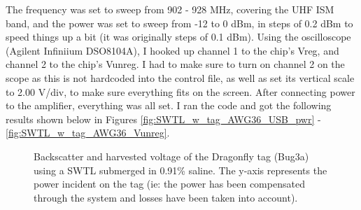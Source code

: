 \documentclass[12pt,onecolumn,titlepage]{article}
\begin{document}
The frequency was set to sweep from 902 - 928 MHz, covering the UHF ISM band, and the power was set to sweep from -12 to 0 dBm, in steps of 0.2 dBm to speed things up a bit (it was originally steps of 0.1 dBm). Using the oscilloscope (Agilent Infiniium DSO8104A), I hooked up channel 1 to the chip's Vreg, and channel 2 to the chip's Vunreg. I had to make sure to turn on channel 2 on the scope as this is not hardcoded into the control file, as well as set its vertical scale to 2.00 V/div, to make sure everything fits on the screen. After connecting power to the amplifier, everything was all set. I ran the code and got the following results shown below in Figures \ref{fig:SWTL_w_tag_AWG36_USB_pwr} - \ref{fig:SWTL_w_tag_AWG36_Vunreg}. 



\begin{figure}[htbp]
	\centering
		\quad
		\quad
	\label{fig:SWTL_w_tag_AWG36}
	\caption{Backscatter and harvested voltage of the Dragonfly tag (Bug3a) using a SWTL submerged in 0.91\% saline. The y-axis represents the power incident on the tag (ie: the power has been compensated through the system and losses have been taken into account).}
\end{figure}
\end{document}
